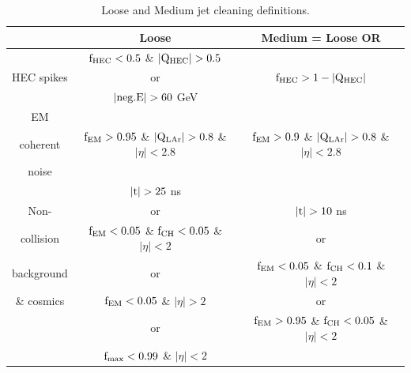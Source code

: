 \begin{table}
\begin{center}
\footnotesize

\begin{tabular}{|c||c|c|}
\hline
& Loose & Medium = Loose OR \\
\hline
            & $\rm f_{HEC}<0.5$ \& $|\rm Q_{HEC}|>0.5$                         &                                                              \\
HEC spikes  &              or                                              & $\rm f_{HEC}>1-|Q_{HEC}|$                                          \\
            &  $\rm |neg.E|>60$ GeV                                        &                                                              \\
\hline
EM          &                                                              &                                                              \\
coherent    & $\rm f_{EM} >0.95$ \& $\rm |Q_{LAr}| >0.8$ \& $|\eta|<2.8$     &   $\rm f_{EM} >0.9$ \& $\rm |Q_{LAr}| >0.8$ \& $|\eta|<2.8$    \\
noise       &                                                              &                                                              \\
\hline
            &           $\rm |t|>25$ ns                                                    &                                                              \\
Non-        &              or                                              &  $\rm |t|>10$ ns                                          \\
collision   & $\rm f_{EM} <0.05$ \& $\rm f_{CH}<0.05$ \& $|\eta|<2$     &   or     \\
background  &        or                     &   $\rm f_{EM}<0.05$ \& $\rm f_{CH} <0.1$ \& $|\eta|<2$    \\
\& cosmics  & $\rm f_{EM} <0.05$ \&  $|\eta|>2$     &   or     \\
            &        or                     &   $\rm f_{EM}>0.95$ \& $\rm f_{CH} <0.05$ \& $|\eta|<2$    \\
             & $\rm f_{max}<0.99$ \&  $|\eta|<2$     &        \\

\hline

\end{tabular}
\caption[Jet Cleaning Definitions]{
Loose and Medium jet cleaning definitions.
\label{det:Cleaning}
}
\end{center}
\end{table}


